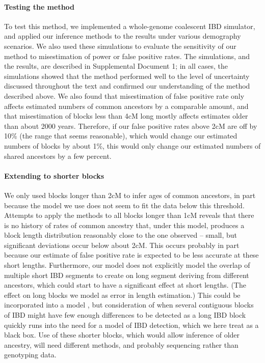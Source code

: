 \documentclass{article}
\begin{document}
\paragraph{Testing the method} 
To test this method, we implemented a whole-genome coalescent IBD simulator,
and applied our inference methods to the results under various demography scenarios.
We also used these simulations to evaluate the sensitivity of our method to misestimation of power or false positive rates.
The simulations, and the results, are described in Supplemental Document 1;
in all cases, the simulations showed that the method performed
well to the level of uncertainty discussed throughout the text and confirmed our understanding of the method described above.
We also found that misestimation of false positive rate 
only affects estimated numbers of common ancestors by a comparable amount,
and that misestimation of blocks less than 4cM long mostly affects estimates older than about 2000 years.
Therefore, if our false positive rates above 2cM are off by 10\% (the range that seems reasonable), 
which would change our estimated numbers of blocks by about 1\%,
this would only change our estimated numbers of shared ancestors by a few percent.


\paragraph{Extending to shorter blocks}
We only used blocks longer than 2cM to infer ages of common ancestors,
in part because the model we use does not seem to fit the data below this threshold.
Attempts to apply the methods to all blocks longer than 1cM 
reveals that there is no history of rates of common ancestry that, under this model,
produces a block length distribution reasonably close to the one observed --
small, but significant deviations occur below about 2cM.
This occurs probably in part because our estimate of false positive rate is expected to be less accurate
at these short lengths.
Furthermore, our model does not explicitly model the overlap of multiple short IBD segments 
to create on long segment deriving from different ancestors,
which could start to have a significant effect at short lengths.
(The effect on long blocks we model as error in length estimation.)
This could be incorporated into a model \citep[in a way analogous to][]{li2011inference},
but consideration of when several contiguous blocks of IBD might have few enough differences
to be detected as a long IBD block
quickly runs into the need for a model of IBD detection,
which we here treat as a black box.
Use of these shorter blocks, which would allow inference of older ancestry,
will need different methods, and probably sequencing rather than
genotyping data.
\end{document}
